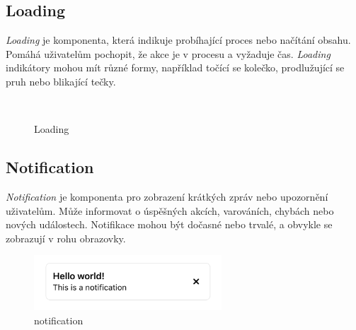 \subsection{Loading}
\emph{Loading} je komponenta, která indikuje probíhající proces nebo načítání obsahu. Pomáhá uživatelům pochopit, že akce je v procesu a vyžaduje čas. \emph{Loading} indikátory mohou mít různé formy, například točící se kolečko, prodlužující se pruh nebo blikající tečky.

\begin{figure}[H]
  \centering
  \hspace{1cm}
  \\
  \captionsetup{justification=centering,margin=2cm}
  \caption{Loading}
\end{figure}

\subsection{Notification}
\emph{Notification} je komponenta pro zobrazení krátkých zpráv nebo upozornění uživatelům. Může informovat o úspěšných akcích, varováních, chybách nebo nových událostech. Notifikace mohou být dočasné nebo trvalé, a obvykle se zobrazují v rohu obrazovky.

\begin{figure}[H]
  \centering
  \includegraphics[width=7cm]{images/notification}
  \captionsetup{justification=centering,margin=2cm}
  \caption{notification} \label{picture:notification}
\end{figure}

